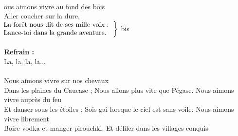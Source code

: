 
\\
{ous} aimons vivre au fond des bois
\\Aller coucher sur la dure,\\
$\left.\begin{tabular}{l}
\hspace{-0.4cm}
La forêt nous dit de ses mille voix :  
\\
\hspace{-0.4cm}
Lance-toi dans la grande aventure. 
\end{tabular}\right\rbrace$ bis
\\\\\textbf{Refrain :}
\\La, la, la, la... 
\\\\Nous aimons vivre sur nos chevaux
\\Dans les plaines du Caucase ;
{Nous allons plus vite que Pégase.}
Nous aimons vivre auprès du feu
\\Et danser sous les étoiles ;
{Sois gai lorsque le ciel est sans voile.}
Nous aimons vivre librement
\\Boire vodka et manger pirouchki.
{Et défiler dans les villages conquis}



\breakpage